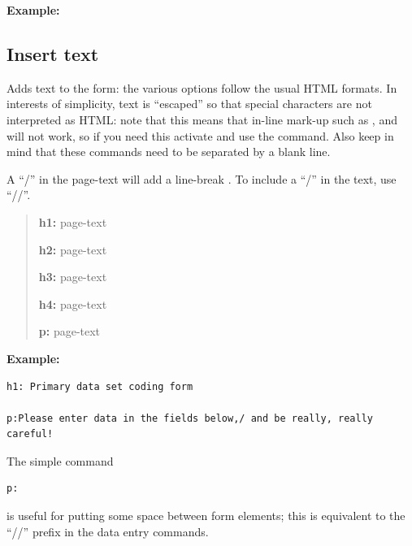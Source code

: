 \documentclass[letterpaper,10pt,english]{sphinxmanual}
\begin{document}
\textbf{Example:}
\begin{quote}

\end{quote}


\subsection{Insert text}
\label{forms:insert-text}
Adds text to the form: the various options follow the usual HTML
formats. In interests of simplicity, text is “escaped” so that special
characters are not interpreted as HTML: note that this means that
in-line mark-up such as ,  and  will not work,
so if you need this activate and use the  command. Also keep in
mind that these commands need to be separated by a blank line.

A “/” in the page-text will add a line-break . To include a
“/” in the text, use “//”.
\begin{quote}

\begin{DUlineblock}{0em}
\item[] \textbf{h1:} page-text
\item[] \textbf{h2:} page-text
\item[] \textbf{h3:} page-text
\item[] \textbf{h4:} page-text
\item[] \textbf{p:} page-text
\end{DUlineblock}
\end{quote}

\textbf{Example:}

\begin{Verbatim}[commandchars=\\\{\}]
h1: Primary data set coding form

p:Please enter data in the fields below,/ and be really, really careful!
\end{Verbatim}

The simple command

\begin{Verbatim}[commandchars=\\\{\}]
p:
\end{Verbatim}

is useful for putting some space between form elements; this is equivalent to the
“//” prefix in the data entry commands.
\end{document}
